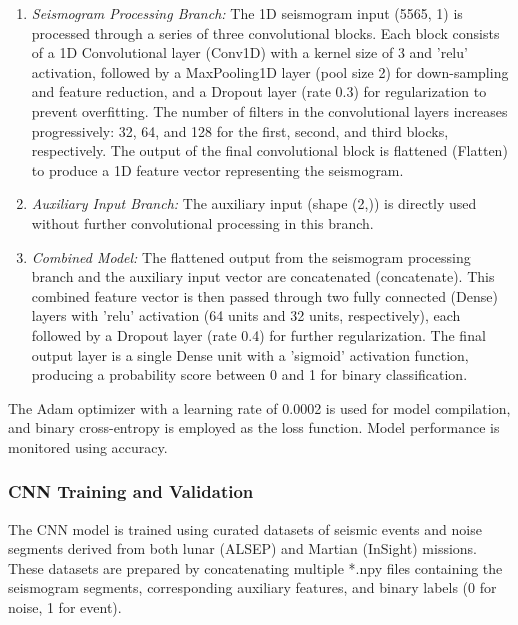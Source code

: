 \documentclass[conference]{IEEEtran}
\begin{document}
            \begin{enumerate}
                \item \textit{Seismogram Processing Branch:} The 1D seismogram input (5565, 1) is processed through a
                series of three convolutional blocks. Each block consists of a 1D Convolutional layer (Conv1D) with a
                kernel size of 3 and 'relu' activation, followed by a MaxPooling1D layer (pool size 2) for down-sampling
                and feature reduction, and a Dropout layer (rate 0.3) for regularization to prevent overfitting. The
                number of filters in the convolutional layers increases progressively: 32, 64, and 128 for the first,
                second, and third blocks, respectively. The output of the final convolutional block is flattened
                (Flatten) to produce a 1D feature vector representing the seismogram.
                
                \item \textit{Auxiliary Input Branch:} The auxiliary input (shape (2,)) is directly used without further
                convolutional processing in this branch.

                \item \textit{Combined Model:} The flattened output from the seismogram processing branch and the
                auxiliary input vector are concatenated (concatenate). This combined feature vector is then passed
                through two fully connected (Dense) layers with 'relu' activation (64 units and 32 units, respectively),
                each followed by a Dropout layer (rate 0.4) for further regularization. The final output layer is a
                single Dense unit with a 'sigmoid' activation function, producing a probability score between 0 and 1
                for binary classification.
            \end{enumerate}
        
            The Adam optimizer \cite{Kingma2014} with a learning rate of 0.0002 is used for model compilation, and binary cross-entropy is employed as the loss function. Model performance is monitored using accuracy.
        
        \subsubsection{CNN Training and Validation}
            The CNN model is trained using curated datasets of seismic events and noise segments derived from both lunar
            (ALSEP) and Martian (InSight) missions. These datasets are prepared by concatenating multiple *.npy files
            containing the seismogram segments, corresponding auxiliary features, and binary labels (0 for noise, 1 for
            event).
        
\end{document}
